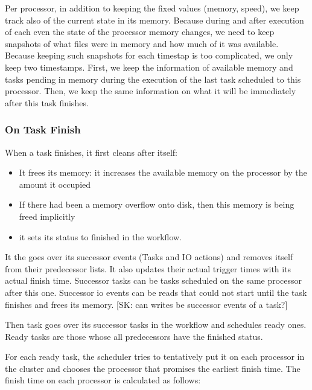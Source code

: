 \documentclass[conference]{IEEEtran}
\newcommand{\skug}[1]{{\color{blue}[SK: #1]}}
\begin{document}
    Per processor,  in addition to keeping the fixed values (memory, speed), we keep track also of the current state in its memory.
    Because during and after execution of each even the state of the processor memory changes, we need to keep snapshots of what files
    were in memory and how much of it was available.
    Because keeping such snapshots for each timestap is too complicated, we only keep two timestamps.
    First, we keep the information of available memory and tasks pending in memory during the execution of the last
    task scheduled to this processor.
    Then, we keep the same information on what it will be immediately after this task finishes.


    \subsubsection{On Task Finish}
    When a task finishes, it first cleans after itself:
    \begin{itemize}
        \item It frees its memory: it increases the available memory on the processor by the amount it occupied
        \item If there had been a memory overflow onto disk, then this memory is being freed implicitly
        \item it sets its status to finished in the workflow.
    \end{itemize}
    It the goes over its successor events (Tasks and IO actions) and removes itself from their predecessor lists.
    It also updates their actual trigger times with its actual finish time.
    Successor tasks can be tasks scheduled on the same processor after this one.
    Successor io events can be reads that could not start until the task finishes and frees its memory.
    \skug{can writes be successor events of a task?}

    Then task goes over its successor tasks in the workflow and schedules ready ones.
    Ready tasks are those whose all predecessors have the finished status.

    For each ready task, the scheduler tries to tentatively put it on each processor in the cluster and chooses the processor
    that promises the earliest finish time.
    The finish time on each processor is calculated as follows:
\end{document}
